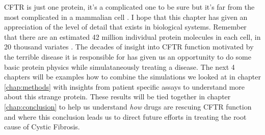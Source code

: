 CFTR is just one protein, it's a complicated one to be sure but it's far from the most complicated in a mammalian cell \cite{saotome2018, zalk2015, chen2018a}. I hope that this chapter has given an appreciation of the level of detail that exists in biological systems. Remember that there are an estimated 42 million individual protein molecules in each cell, in 20 thousand variates \cite{ho2018, salzberg2018}. The decades of insight into CFTR function motivated by the terrible disease it is responsible for has given us an opportunity to do some basic protein physics while simulataneously treating a disease. The next 4 chapters will be examples how to combine the simulations we looked at in chapter \ref{chap:methods} with insights from patient specific assays to understand more about this strange protein. These results will be tied together in chapter \ref{chap:conclusion} to help us understand \textit{how} drugs are rescuing CFTR function and where this conclusion leads us to direct future efforts in treating the root cause of Cystic Fibrosis.

